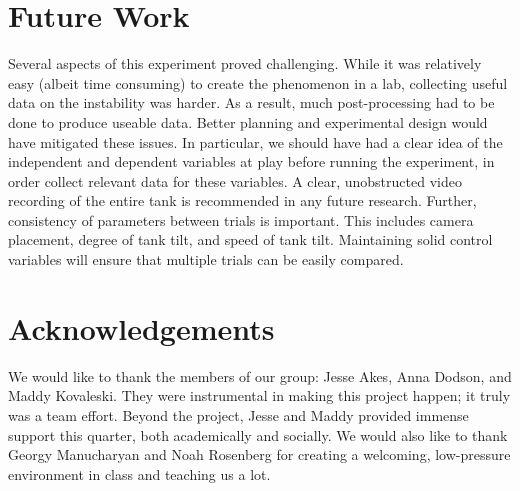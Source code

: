 \documentclass{article}
\begin{document}
\section{Future Work}

Several aspects of this experiment proved challenging. While it was relatively
easy (albeit time consuming) to create the phenomenon in a lab, collecting
useful data on the instability was harder. As a result, much post-processing had
to be done to produce useable data. Better planning and experimental design
would have mitigated these issues. In particular, we should have had a clear
idea of the independent and dependent variables at play before running the
experiment, in order collect relevant data for these variables. A clear,
unobstructed video recording of the entire tank is recommended in any future
research. Further, consistency of parameters between trials is important. This
includes camera placement, degree of tank tilt, and speed of tank tilt.
Maintaining solid control variables will ensure that multiple trials can be
easily compared.

\section{Acknowledgements}

We would like to thank the members of our group: Jesse Akes, Anna Dodson, and
Maddy Kovaleski. They were instrumental in making this project happen; it truly
was a team effort. Beyond the project, Jesse and Maddy provided immense support
this quarter, both academically and socially. We would also like to thank Georgy
Manucharyan and Noah Rosenberg for creating a welcoming, low-pressure
environment in class and teaching us a lot.  

\newpage
{}

\end{document}
